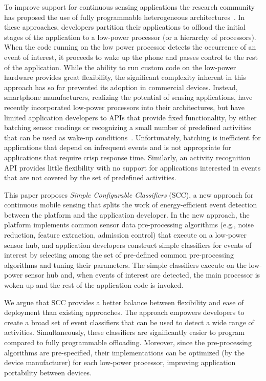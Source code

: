 To improve support for continuous sensing applications the research
community has proposed the use of fully progra\-mmable heterogeneous
architectures~\cite{reflex,littlerock,turducken}.  In these
approaches, developers partition their applications to offload the
initial stages of the application to a low-power processor (or a
hierarchy of processors).  When the code running on the low power
processor detects the occurrence of an event of interest, it proceeds
to wake up the phone and passes control to the rest of the
application.  While the ability to run custom code on the low-power
hardware provides great flexibility, the significant complexity
inherent in this approach has so far prevented its adoption in
commercial devices.  Instead, smartphone manufacturers, realizing the
potential of sensing applications, have recently incorporated
low-power processors into their architectures, but have limited
application developers to APIs that provide fixed functionality, by
either batching sensor readings or recognizing a small number of
predefined activities that can be used as wake-up
conditions~\cite{androidMotionSensors,coreMotion,motox}.
Unfortunately, batching is inefficient for applications that depend on
infrequent events and is not appropriate for applications that require
crisp response time.  Similarly, an activity recognition API provides
little flexibility with no support for applications interested in
events that are not covered by the set of predefined activities.

This paper proposes {\em Simple Configurable Classifiers} (SCC), a new
approach for continuous mobile sensing that splits the work of
energy-efficient event detection between the platform and the
application developer.  In the new approach, the platform implements
common sensor data pre-processing algorithms (e.g., noise reduction,
feature extraction, admission control) that execute on a low-power
sensor hub, and application developers construct simple 
classifiers for events of interest by selecting among the set of
pre-defined common pre-processing algorithms and tuning their
parameters.  The simple classifiers execute on the
low-power sensor hub and, when events of interest are detected, the
main processor is woken up and the rest of the application code is
invoked.
  
We argue that SCC provides a better
balance between flexibility and ease of deployment than existing
approaches.  The approach empowers developers to create a broad set of
event classifiers that can be used to detect a wide range of
activities.  Simultaneously, these classifiers are significantly
easier to program compared to fully programmable offloading.
Moreover, since the pre-processing algorithms are pre-specified, their
implementations can be optimized (by the device manufacturer) for each
low-power processor, improving application portability between
devices.  

